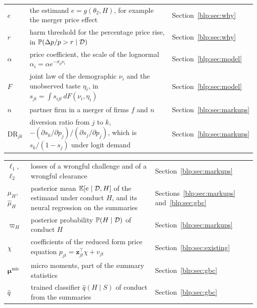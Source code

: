 {\noindent\small\centering
\setlength{\tabcolsep}{4pt}\renewcommand{\arraystretch}{1.1}
\begin{tabular}{>{\raggedright\arraybackslash}p{1.0in}>{\raggedright\arraybackslash}p{2.15in}>{\raggedright\arraybackslash}p{0.95in}}
$e$ & the estimand $e = g(\theta_2, H)$, for example the merger price effect & Section~\ref{blp:sec:why} \\
$r$ & harm threshold for the percentage price rise, in $\mathbb{P}(\Delta p/p > r \mid \mathcal{D})$ & Section~\ref{blp:sec:why} \\
$\alpha$ & price coefficient, the scale of the lognormal $\alpha_i = \alpha e^{-\sigma_p\nu_i}$ & Section~\ref{blp:sec:model} \\
$F$ & joint law of the demographic $\nu_i$ and the unobserved taste $\eta_i$, in $s_{jt} = \int s_{ijt}\,dF(\nu_i, \eta_i)$ & Section~\ref{blp:sec:model} \\
$n$ & partner firm in a merger of firms $f$ and $n$ & Section~\ref{blp:sec:markups} \\
$\mathrm{DR}_{jk}$ & diversion ratio from $j$ to $k$, $-(\partial s_k/\partial p_j)/(\partial s_j/\partial p_j)$, which is $s_k/(1 - s_j)$ under logit demand & Section~\ref{blp:sec:markups} \\
\end{tabular}\par}

{\noindent\small\centering
\setlength{\tabcolsep}{4pt}\renewcommand{\arraystretch}{1.1}
\begin{tabular}{>{\raggedright\arraybackslash}p{1.0in}>{\raggedright\arraybackslash}p{2.15in}>{\raggedright\arraybackslash}p{0.95in}}
$\ell_1$, $\ell_2$ & losses of a wrongful challenge and of a wrongful clearance & Section~\ref{blp:sec:markups} \\
$\mu_H$, $\hat\mu_H$ & posterior mean $\mathbb{E}[e \mid \mathcal{D}, H]$ of the estimand under conduct $H$, and its neural regression on the summaries & Sections~\ref{blp:sec:markups} and~\ref{blp:sec:gbc} \\
$\varpi_H$ & posterior probability $\mathbb{P}(H \mid \mathcal{D})$ of conduct $H$ & Section~\ref{blp:sec:markups} \\
$\chi$ & coefficients of the reduced form price equation $p_{jt} = \bm z_{jt}^\top\chi + v_{jt}$ & Section~\ref{blp:sec:existing} \\
$\bm\mu^{\mathrm{mic}}$ & micro moments, part of the summary statistics & Section~\ref{blp:sec:gbc} \\
$\hat q$ & trained classifier $\hat q(H \mid S)$ of conduct from the summaries & Section~\ref{blp:sec:gbc} \\
\end{tabular}\par}

